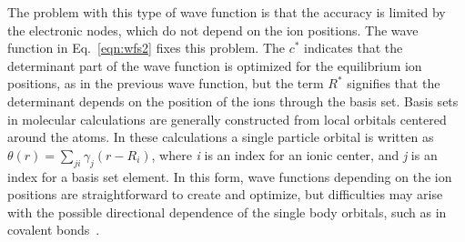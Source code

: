 \documentclass[aip,jcp,numerical,reprint]{revtex4-1}
\begin{document}
The problem with this type of wave function is that the accuracy is limited by the electronic nodes, which do not depend on the ion positions.
The wave function in Eq.~\eqref{eqn:wfs2} fixes this problem.  
The $c^{*}$ indicates that the determinant part of the wave function is optimized for the equilibrium ion positions, as in the previous wave function, but the term $R^{*}$ signifies that the determinant  depends on the position of the ions through the basis set.  Basis sets in molecular calculations are generally constructed from local orbitals centered around the atoms.  In these calculations a single particle orbital is written as $\theta(r) = \sum_{ji}\gamma_{j}(r-R_{i})$, where \textit{i} is an index for an ionic center, and \textit{j} is an index for a basis set element.  
In this form, wave functions depending on the ion positions are straightforward to create and optimize,
but difficulties may arise with the possible directional dependence of the single body orbitals, such as in covalent bonds~\cite{Tubman_ECG}. %
\end{document}
